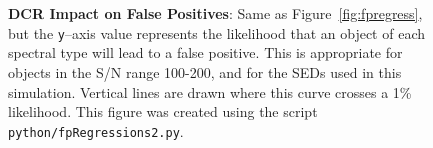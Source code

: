 \documentclass[DM,toc]{lsstdoc}
\begin{document}
\begin{figure}[!ht]
  \centering
   \\
   \\
  \caption{{\bf DCR Impact on False Positives}: Same as
    Figure~\ref{fig:fpregress}, but the {\tt y}--axis value represents
    the likelihood that an object of each spectral type will lead to a
    false positive.  This is appropriate for objects in the S/N range
    100-200, and for the SEDs used in this simulation.  Vertical lines
    are drawn where this curve crosses a 1\% likelihood.  This figure
    was created using the script {\tt python/fpRegressions2.py}.}
  \label{fig:fpregress2}
\end{figure}
\end{document}
